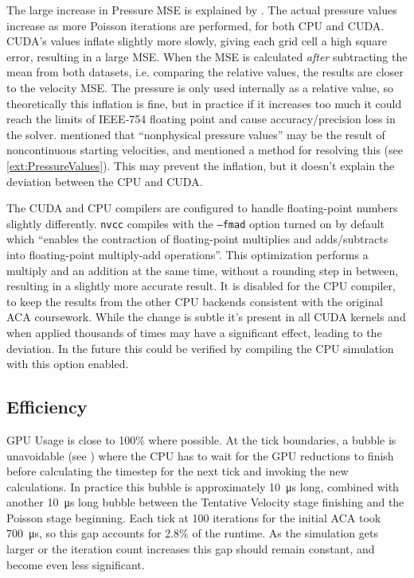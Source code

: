 The large increase in Pressure MSE is explained by .
The actual pressure values increase as more Poisson iterations are performed, for both CPU and CUDA.
CUDA's values inflate slightly more slowly, giving each grid cell a high square error, resulting in a large MSE.
When the MSE is calculated \emph{after} subtracting the mean from both datasets, i.e. comparing the relative values, the results are closer to the velocity MSE.
The pressure is only used internally as a relative value, so theoretically this inflation is fine, but in practice if it increases too much it could reach the limits of IEEE-754 floating point  and cause accuracy/precision loss in the solver.
\cite{book:griebel1998numerical} mentioned that ``nonphysical pressure values'' may be the result of noncontinuous starting velocities, and mentioned a method for resolving this (see \cref{ext:PressureValues}). This may prevent the inflation, but it doesn't explain the deviation between the CPU and CUDA.

The CUDA and CPU compilers are configured to handle floating-point numbers slightly differently.
\texttt{nvcc} compiles with the \texttt{--fmad} option turned on by default which ``enables the contraction of floating-point multiplies and adds/subtracts into floating-point multiply-add operations''.
This optimization performs a multiply and an addition at the same time, without a rounding step in between, resulting in a slightly more accurate result.
It is disabled for the CPU compiler, to keep the results from the other CPU backends consistent with the original ACA coursework.
While the change is subtle it's present in all CUDA kernels and when applied thousands of times may have a significant effect, leading to the deviation.
In the future this could be verified by compiling the CPU simulation with this option enabled.

\subsection{Efficiency}\label{sec:Results:Sim:Efficiency}
GPU Usage is close to 100\% where possible.
At the tick boundaries, a bubble is unavoidable (see ) where the CPU has to wait for the GPU reductions to finish before calculating the timestep for the next tick and invoking the new calculations.
In practice this bubble is approximately \SI{10}{\micro\second} long, combined with another \SI{10}{\micro\second} long bubble between the Tentative Velocity stage finishing and the Poisson stage beginning.
Each tick at 100 iterations for the initial ACA took \SI{700}{\micro\second}, so this gap accounts for 2.8\% of the runtime.
As the simulation gets larger or the iteration count increases this gap should remain constant, and become even less significant.

